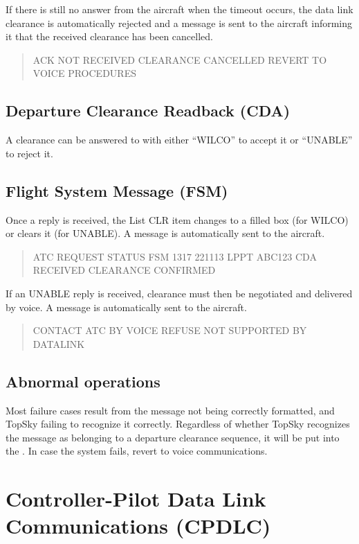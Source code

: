 \documentclass[11pt,a4paper]{memoir}
\begin{document}
If there is still no answer from the aircraft when the timeout occurs, the data link clearance is automatically rejected and a message is sent to the aircraft informing it that the received clearance has been cancelled.

\begin{quote}
  ACK NOT RECEIVED CLEARANCE CANCELLED REVERT TO VOICE PROCEDURES
\end{quote}

\subsection*{Departure Clearance Readback (CDA)}

A clearance can be answered to with either “WILCO” to accept it or “UNABLE” to reject it.

\subsection*{Flight System Message (FSM)}

Once a reply is received, the List CLR item changes to a filled box (for WILCO) or clears it (for UNABLE). A message is automatically sent to the aircraft.

\begin{quote}
  ATC REQUEST STATUS FSM 1317 221113 LPPT ABC123 CDA RECEIVED CLEARANCE CONFIRMED 
\end{quote}

If an UNABLE reply is received, clearance must then be negotiated and delivered by voice. A message is automatically sent to the aircraft.

\begin{quote}
  CONTACT ATC BY VOICE REFUSE NOT SUPPORTED BY DATALINK
\end{quote}

\subsection{Abnormal operations}

Most failure cases result from the message not being correctly formatted, and TopSky failing to recognize it correctly. Regardless of whether TopSky recognizes the message as belonging to a departure clearance sequence, it will be put into the \textit{}. In case the system fails, revert to voice communications.

\section{Controller-Pilot Data Link Communications (CPDLC)}
\label{cpdlc}
\end{document}
